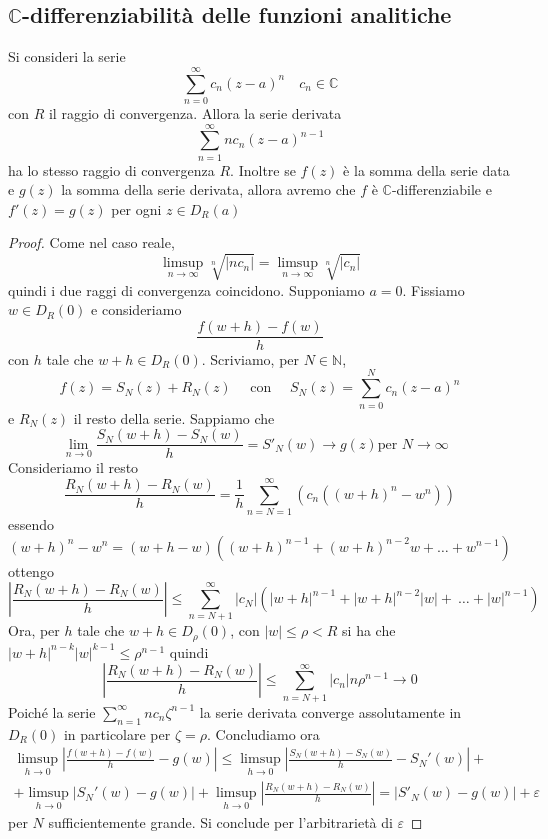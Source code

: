 \subsection{\(\mathbb{C}\)-differenziabilità delle funzioni analitiche}
\begin{theorem}
    Si consideri la serie 
    \[
        \sum_{n=0}^{\infty} c_{n} {\left( z-a \right)}^{n} \quad c_{n} \in \mathbb{C} 
    \]
    con \(R\) il raggio di convergenza.
    Allora la serie derivata 
    \[
        \sum_{n=1}^{\infty} nc_{n} {\left( z-a \right)}^{n-1}
    \] ha lo stesso raggio di convergenza \(R\). Inoltre se \(f(z)\) è la somma
    della serie data e \(g(z)\) la somma della serie derivata, allora avremo che
    \(f\) è \(\mathbb{C}\)-differenziabile e \(f'(z) = g(z)\) per ogni \(z \in
    D_R(a)\)
\end{theorem}
\begin{proof}
    Come nel caso reale,
    \[
        \limsup_{n \to \infty} \sqrt[n]{|nc_{n}|} = \limsup_{n\to \infty}{\sqrt[n]{|c_{n}|}} 
    \]
    quindi i due raggi di convergenza coincidono. Supponiamo \(a=0\). Fissiamo
    \(w \in D_R(0)\) e consideriamo
    \[
        \frac{f(w+h) - f(w)}{h}
    \] con \(h\) tale che \(w+h \in D_R(0)\). Scriviamo, per \(N \in
    \mathbb{N}\),
    \[
        f(z) = S_N(z) + R_N(z) \quad \text{ con } \quad S_N(z) = \sum_{n=0}^{N}
        c_{n} {\left( z - a \right)}^{n}
    \]
    e \(R_N(z)\) il resto della serie. Sappiamo che 
    \[
        \lim_{n \to 0} \frac{S_N(w + h) - S_N(w)}{h} = S'_N(w) \to g(z) \text{
        per \(N\to \infty\)  }
    \]
    Consideriamo il resto
    \[
        \frac{R_N(w +h) - R_N(w)}{h} = \frac{1}{h} \sum_{n=N=1}^{\infty} {\left(
        c_{n} {\left( {\left( w+h \right)}^{n} - w^{n} \right)} \right)}  
    \]
    essendo
    \[
        {\left( w + h \right)}^{n} - w^{n} = {\left( w + h - w \right)} {\left(
        {\left( w+h \right)}^{n-1} + {\left( w+h \right)}^{n-2} w + \dots +
w^{n-1}\right)} 
    \]
    ottengo
    \[
        \left| \frac{R_N(w+h)-R_N(w)}{h} \right| \le \sum_{n=N+1}^{\infty} |c_N| {\left( |w+h|^{n-1}
        +|w+h|^{n-2} |w| +~\dots + |w|^{n-1}\right)} 
    \]
    Ora, per \(h\) tale che \(w+h \in D_\rho(0)\), con \(|w| \le \rho < R\) si
    ha che \(|w+h|^{n-k} |w|^{k-1} \le \rho^{n-1}\) quindi
    \[
        \left| \frac{R_N(w+h) -R_N(w)}{h} \right| \le \sum_{n=N+1}^{\infty}
        |c_n| n \rho^{n-1} \to 0
    \]
    Poiché la serie \(\sum_{n=1}^{\infty} nc_{n} \zeta^{n-1} \) la serie
    derivata converge assolutamente in \(D_R(0)\) in particolare per \(\zeta =
    \rho\). 
    Concludiamo ora 
    \begin{align*}
        \limsup_{h\to 0} \left| \frac{f(w+h) - f(w)}{h} -g(w)\right| \le
        \limsup_{h\to 0} \left| \frac{S_N(w+h) - S_N(w)}{h} - S_N'(w) \right| +
        \\ +
        \limsup_{h \to 0} \left| S_N'(w) - g(w) \right| + \limsup_{h\to 0}
        \left| \frac{R_N(w+h) - R_N(w)}{h} \right| = |S'_N(w) - g(w)| +
        \varepsilon
    \end{align*}
    per \(N\) sufficientemente grande. Si conclude per l'arbitrarietà di \(\varepsilon\) 
\end{proof}

